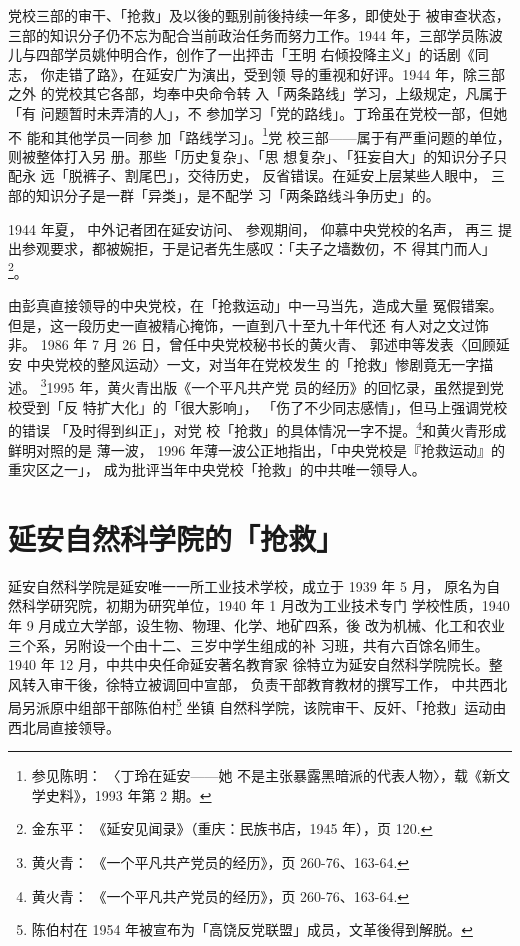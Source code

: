 党校三部的审干、「抢救」及以後的甄别前後持续一年多，即使处于 被审查状态，
三部的知识分子仍不忘为配合当前政治任务而努力工作。1944 年，三部学员陈波
儿与四部学员姚仲明合作，创作了一出抨击「王明 右倾投降主义」的话剧《同志，
你走错了路》，在延安广为演出，受到领 导的重视和好评。1944 年，除三部之外
的党校其它各部，均奉中央命令转 入「两条路线」学习，上级规定，凡属于「有
问题暂时未弄清的人」，不 参加学习「党的路线」。丁玲虽在党校一部，但她不
能和其他学员一同参 加「路线学习」。\footnote{参见陈明： 〈丁玲在延安——她
不是主张暴露黑暗派的代表人物〉，载《新文学史料》，1993 年第 2 期。}党
校三部——属于有严重问题的单位，则被整体打入另 册。那些「历史复杂」、「思
想复杂」、「狂妄自大」的知识分子只配永 远「脱裤子、割尾巴」，交待历史，
反省错误。在延安上层某些人眼中， 三部的知识分子是一群「异类」，是不配学
习「两条路线斗争历史」的。

1944 年夏， 中外记者团在延安访问、 参观期间， 仰慕中央党校的名声， 再三
提出参观要求，都被婉拒，于是记者先生感叹：「夫子之墙数仞，不 得其门而人」
\footnote{金东平： 《延安见闻录》（重庆：民族书店，1945 年），页 120.}。

由彭真直接领导的中央党校，在「抢救运动」中一马当先，造成大量 冤假错案。
但是，这一段历史一直被精心掩饰，一直到八十至九十年代还 有人对之文过饰非。
1986 年 7 月 26 日，曾任中央党校秘书长的黄火青、 郭述申等发表〈回顾延安
中央党校的整风运动〉一文，对当年在党校发生 的「抢救」惨剧竟无一字描述。
\footnote{黄火青： 《一个平凡共产党员的经历》，页 260-76、163-64.}1995
年，黄火青出版《一个平凡共产党 员的经历》的回忆录，虽然提到党校受到「反
特扩大化」的「很大影响」， 「伤了不少同志感情」，但马上强调党校的错误
「及时得到纠正」，对党 校「抢救」的具体情况一字不提。\footnote{黄火青：
《一个平凡共产党员的经历》，页 260-76、163-64.}和黄火青形成鲜明对照的是
薄一波， 1996 年薄一波公正地指出，「中央党校是『抢救运动』的重灾区之一」，
成为批评当年中央党校「抢救」的中共唯一领导人。

\section{延安自然科学院的「抢救」}

延安自然科学院是延安唯一一所工业技术学校，成立于 1939 年 5 月，
原名为自然科学研究院，初期为研究单位，1940 年 1 月改为工业技术专门
学校性质，1940 年 9 月成立大学部，设生物、物理、化学、地矿四系，後
改为机械、化工和农业三个系，另附设一个由十二、三岁中学生组成的补
习班，共有六百馀名师生。1940 年 12 月，中共中央任命延安著名教育家
徐特立为延安自然科学院院长。整风转入审干後，徐特立被调回中宣部，
负责干部教育教材的撰写工作，
中共西北局另派原中组部干部陈伯村\footnote{陈伯村在 1954 年被宣布为「高饶反党联盟」成员，文革後得到解脱。} 坐镇
自然科学院，该院审干、反奸、「抢救」运动由西北局直接领导。

